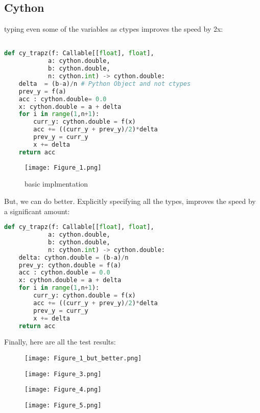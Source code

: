 \documentclass{article}
\begin{document}
\subsection{Cython}
typing even some of the variables as ctypes improves the speed by 2x:
\begin{lstlisting}[language=Python]

def cy_trapz(f: Callable[[float], float], 
			a: cython.double, 
			b: cython.double, 
			n: cython.int) -> cython.double:
    delta  = (b-a)/n # Python Object and not ctypes
    prev_y = f(a)
    acc : cython.double= 0.0
    x: cython.double = a + delta
    for i in range(1,n+1):
        curr_y: cython.double = f(x)
        acc += ((curr_y + prev_y)/2)*delta
        prev_y = curr_y
        x += delta
    return acc
\end{lstlisting}

\begin{figure}[!h]
	\centering
	\texttt{[image: Figure\_1.png]}
    \caption{basic implmentation}
\end{figure}

But, we can do better. Explicitly specifying all the types, improves the speed
by a significant amount:
\begin{lstlisting}[language=Python]
def cy_trapz(f: Callable[[float], float], 
			a: cython.double, 
			b: cython.double, 
			n: cython.int) -> cython.double:
    delta: cython.double = (b-a)/n
    prev_y: cython.double = f(a)
    acc : cython.double = 0.0
    x: cython.double = a + delta
    for i in range(1,n+1):
        curr_y: cython.double = f(x)
        acc += ((curr_y + prev_y)/2)*delta
        prev_y = curr_y
        x += delta
    return acc
\end{lstlisting}

Finally, here are all the test results:
\begin{figure}[!h]
	\centering
	\texttt{[image: Figure\_1\_but\_better.png]}
\end{figure}

\begin{figure}[!h]
	\centering
	\texttt{[image: Figure\_3.png]}
\end{figure}
\begin{figure}[!h]
	\centering
	\texttt{[image: Figure\_4.png]}
\end{figure}
\begin{figure}[!h]
	\centering
	\texttt{[image: Figure\_5.png]}
\end{figure}
\end{document}
